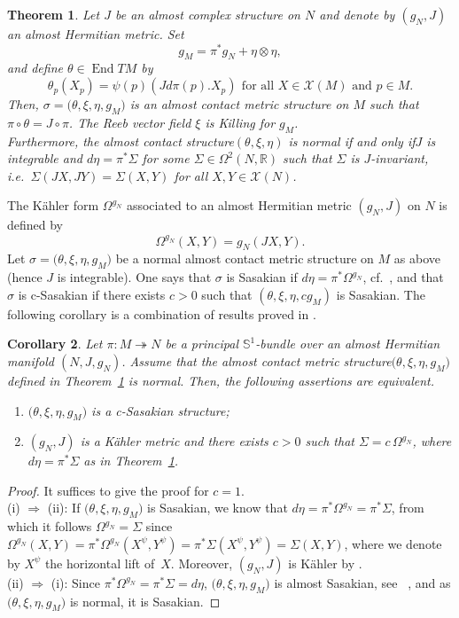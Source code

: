 \documentclass[a4paper,reqno]{amsart}
\newtheorem{thm}{Theorem}[section]
\newtheorem{cor}[thm]{Corollary}
\theoremstyle{definition}
\theoremstyle{remark}
\theoremstyle{plain}
\numberwithin{equation}{section}
\newcommand{\R}{{\mathbb{R}}}
\newcommand{\bbS}{{\mathbb{S}}}
\newcommand{\calX}{{\mathcal{X}}}
\newcommand{\sto}{\twoheadrightarrow}
\newcommand{\imply}{\Rightarrow}
\def\End{\operatorname {End}}
\newcommand{\kahler}{K\"ahler\xspace}
\newcommand{\sissi}{if and only if\xspace}
\newcommand{\ACS}{almost contact structure\xspace}
\newcommand{\NACMS}{normal almost contact metric
  structure\xspace}
\newcommand{\ACMS}{almost contact metric
  structure\xspace}
\newcommand{\txe}{{(\theta,\xi,\eta)}}
\newcommand{\txeM}{{(\theta,\xi,\eta,g_M})}
\begin{document}
 \begin{thm}
   \label{thm1.1}
   Let $J$ be an almost complex structure on $N$ and denote by
   $(g_N, J)$ an almost Hermitian metric. Set
   \begin{equation*} %
g_M = \pi^* g_N + \eta \otimes \eta,
\end{equation*}
and define $\theta \in \End TM$ by
\begin{equation}
  \label{eq3.1}
  \theta_p(X_p) = \psi(p)(Jd\pi(p).X_p) \ \, \text{for all $X \in
    \calX(M)$ and $p \in M$}.
\end{equation}
 Then, $\sigma= \txeM$ is an \ACMS on $M$ such that $\pi \circ
\theta= J \circ \pi$. The Reeb vector field $\xi$ is Killing for
$g_M$.
\\
Furthermore, the \ACS $\txe$ is normal \sissi $J$ is integrable and
$d\eta= \pi^* \Sigma$ for some $\Sigma \in \Omega^2(N,\R)$ such
that $\Sigma$ is $J$-invariant, i.e.~$\Sigma(JX,JY)= \Sigma(X,Y)$
for all $X,Y \in \calX(N)$.
 \end{thm}
 
 The \kahler form $\Omega^{g_N}$ associated
 to an almost Hermitian metric $(g_N,J)$ on $N$ is defined by
\[
\Omega^{g_N}(X,Y) = g_N(JX,Y).
\]
Let $\sigma=\txeM$ be a \NACMS on $M$ as above (hence $J$ is
integrable). One says that $\sigma$ is Sasakian if
$d\eta= \pi^* \Omega^{g_N}$, cf.~\cite[Definitions~2.2
\&~4.2]{Ogi}, and that $\sigma$ is c-Sasakian if there exists
$c >0$ such that $(\theta,\xi,\eta, cg_M)$ is Sasakian.  The
following corollary is a combination of results proved
in \cite[\S 4]{Ogi}.


\begin{cor}
  \label{cor3.8}
  Let $\pi : M \sto N$ be a principal $\bbS^1$-bundle over an almost
  Hermitian manifold $(N,J,g_N)$. Assume that the \ACMS  $\txeM$
  defined in Theorem~\ref{thm1.1} is normal.  Then, the
  following assertions are equivalent.
  \begin{enumerate}[\rm (i)]
  \item $\txeM$ is a c-Sasakian structure;
    \item $(g_N,J)$ is a \kahler metric and there exists $c >0$
      such that $\Sigma = c\, \Omega^{g_N}$, where $d\eta=
      \pi^*\Sigma$ as in Theorem~\ref{thm1.1}. 
  \end{enumerate}
\end{cor}


\begin{proof} It suffices to give the proof for $c=1$.
  \\
  (i) $\imply$ (ii): If $\txeM$ is Sasakian, we know that
  $d\eta= \pi^*\Omega^{g_N}= \pi^*\Sigma$, from which it follows
  $\Omega^{g_N}= \Sigma$ since
  $\Omega^{g_N}(X,Y)= \pi^*\Omega^{g_N}(X^\psi,Y^\psi)=
  \pi^*\Sigma(X^\psi,Y^\psi)= \Sigma(X,Y)$, where we denote by
  $X^\psi$ the horizontal lift of~$X$. Moreover, $(g_N,J)$ is
  \kahler by \cite[\S 4, Corollary]{Ogi}.
  \\
  (ii) $\imply$ (i): %
  Since $\pi^*\Omega^{g_N}= \pi^*\Sigma= d\eta$, $\txeM$ is
  almost Sasakian, see ~\cite[Definitions~4.2]{Ogi}, and  as
  $\txeM$ is normal, it is Sasakian.
\end{proof}
\end{document}
